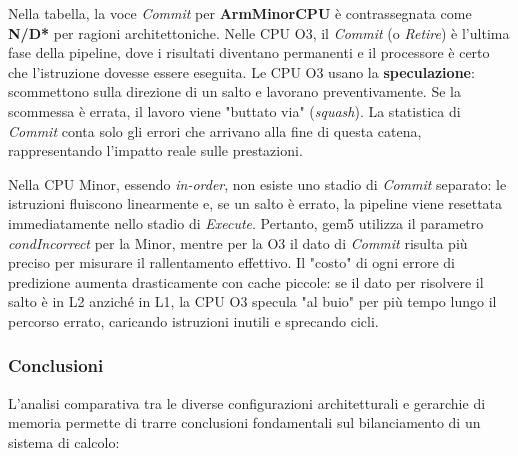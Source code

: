 \documentclass[../../main_document/main.tex]{subfiles}
\begin{document}
\vspace{5pt} \noindent Nella tabella, la voce \textit{Commit} per \textbf{ArmMinorCPU} è contrassegnata come \textbf{N/D*} per ragioni architettoniche. Nelle CPU O3, il \textit{Commit} (o \textit{Retire}) è l'ultima fase della pipeline, dove i risultati diventano permanenti e il processore è certo che l'istruzione dovesse essere eseguita. Le CPU O3 usano la \textbf{speculazione}: scommettono sulla direzione di un salto e lavorano preventivamente. Se la scommessa è errata, il lavoro viene "buttato via" (\textit{squash}). La statistica di \textit{Commit} conta solo gli errori che arrivano alla fine di questa catena, rappresentando l'impatto reale sulle prestazioni.

\vspace{8pt}
\noindent
Nella CPU Minor, essendo \textit{in-order}, non esiste uno stadio di \textit{Commit} separato: le istruzioni fluiscono linearmente e, se un salto è errato, la pipeline viene resettata immediatamente nello stadio di \textit{Execute}. Pertanto, gem5 utilizza il parametro \textit{condIncorrect} per la Minor, mentre per la O3 il dato di \textit{Commit} risulta più preciso per misurare il rallentamento effettivo. Il "costo" di ogni errore di predizione aumenta drasticamente con cache piccole: se il dato per risolvere il salto è in L2 anziché in L1, la CPU O3 specula "al buio" per più tempo lungo il percorso errato, caricando istruzioni inutili e sprecando cicli.

\subsubsection{Conclusioni}

L'analisi comparativa tra le diverse configurazioni architetturali e gerarchie di memoria permette di trarre conclusioni fondamentali sul bilanciamento di un sistema di calcolo:
\end{document}
